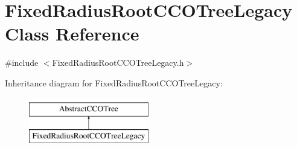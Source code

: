 \hypertarget{class_fixed_radius_root_c_c_o_tree_legacy}{}\section{Fixed\+Radius\+Root\+C\+C\+O\+Tree\+Legacy Class Reference}
\label{class_fixed_radius_root_c_c_o_tree_legacy}


{\ttfamily \#include $<$Fixed\+Radius\+Root\+C\+C\+O\+Tree\+Legacy.\+h$>$}

Inheritance diagram for Fixed\+Radius\+Root\+C\+C\+O\+Tree\+Legacy\+:\begin{figure}[H]
\begin{center}
\leavevmode
\includegraphics[height=2.000000cm]{class_fixed_radius_root_c_c_o_tree_legacy}
\end{center}
\end{figure}
